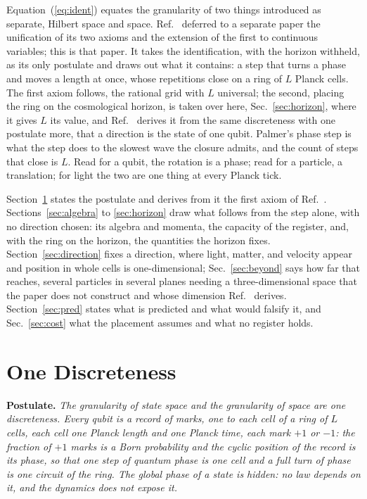 \documentclass[aps,prd,twocolumn,superscriptaddress,nofootinbib]{revtex4-2}
\begin{document}
Equation~(\ref{eq:ident}) equates the granularity of two things introduced as separate, Hilbert space and space. Ref.~\cite{korytko2026} deferred to a separate paper the unification of its two axioms and the extension of the first to continuous variables; this is that paper. It takes the identification, with the horizon withheld, as its only postulate and draws out what it contains: a step that turns a phase and moves a length at once, whose repetitions close on a ring of $L$ Planck cells. The first axiom follows, the rational grid with $L$ universal; the second, placing the ring on the cosmological horizon, is taken over here, Sec.~\ref{sec:horizon}, where it gives $L$ its value, and Ref.~\cite{korytko2026d} derives it from the same discreteness with one postulate more, that a direction is the state of one qubit. Palmer's phase step is what the step does to the slowest wave the closure admits, and the count of steps that close is $L$. Read for a qubit, the rotation is a phase; read for a particle, a translation; for light the two are one thing at every Planck tick.

Section~\ref{sec:register} states the postulate and derives from it the first axiom of Ref.~\cite{korytko2026}. Sections~\ref{sec:algebra} to \ref{sec:horizon} draw what follows from the step alone, with no direction chosen: its algebra and momenta, the capacity of the register, and, with the ring on the horizon, the quantities the horizon fixes. Section~\ref{sec:direction} fixes a direction, where light, matter, and velocity appear and position in whole cells is one-dimensional; Sec.~\ref{sec:beyond} says how far that reaches, several particles in several planes needing a three-dimensional space that the paper does not construct and whose dimension Ref.~\cite{korytko2026d} derives. Section~\ref{sec:pred} states what is predicted and what would falsify it, and Sec.~\ref{sec:cost} what the placement assumes and what no register holds.

\section{One Discreteness}
\label{sec:register}

\textbf{Postulate.} \emph{The granularity of state space and the granularity of space are one discreteness. Every qubit is a record of marks, one to each cell of a ring of $L$ cells, each cell one Planck length and one Planck time, each mark $+1$ or $-1$: the fraction of $+1$ marks is a Born probability and the cyclic position of the record is its phase, so that one step of quantum phase is one cell and a full turn of phase is one circuit of the ring. The global phase of a state is hidden: no law depends on it, and the dynamics does not expose it.}
\end{document}
